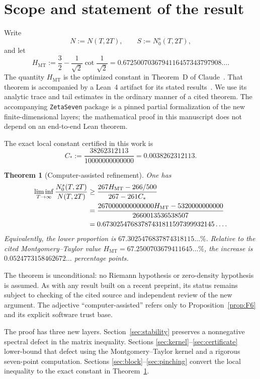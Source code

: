 \documentclass[11pt]{article}
\newtheorem{theorem}{Theorem}[section]
\newcommand{\MT}{\mathrm{MT}}
\newcommand{\Nsimple}{N_0^s}
\begin{document}
\section{Scope and statement of the result}

Write
\[
 N:=N(T,2T),\qquad S:=\Nsimple(T,2T),
\]
and let
\begin{equation}\label{eq:HMT}
 H_{\MT}:=\frac32-\frac1{\sqrt2}\cot\frac1{\sqrt2}
 =0.6725007036794116457343797908\ldots .
\end{equation}
The quantity $H_{\MT}$ is the optimized constant in Theorem~D of
Claude~\cite{Claude26}.  That theorem is accompanied by a Lean~4 artifact for
its stated results~\cite{ClaudeLean26}.  We use its analytic trace and tail
estimates in the ordinary manner of a cited theorem.  The accompanying
\texttt{ZetaSeven} package is a pinned partial formalization of the new
finite-dimensional layers; the mathematical proof in this manuscript does
not depend on an end-to-end Lean theorem.

The exact local constant certified in this work is
\begin{equation}\label{eq:Cstar}
 C_*:=\frac{38262312113}{10000000000000}
 =0.0038262312113.
\end{equation}

\begin{theorem}[Computer-assisted refinement]\label{thm:main}
One has
\begin{align}
 \liminf_{T\to\infty}\frac{\Nsimple(T,2T)}{N(T,2T)}
 &\ge \frac{267H_{\MT}-266/500}{267-261C_*}\label{eq:main-formula}\\
 &=\frac{2670000000000000H_{\MT}-5320000000000}
 {2660013536538507}\notag\\
 &=0.67302547683787431811597399932145\ldots .\notag
\end{align}
Equivalently, the lower proportion is
$67.3025476837874318115\ldots\%$.  Relative to the cited
Montgomery--Taylor value $H_{\MT}=67.2500703679411645\ldots\%$, the increase
is $0.0524773158462672\ldots$ percentage points.
\end{theorem}

The theorem is unconditional: no Riemann hypothesis or zero-density
hypothesis is assumed.  As with any result built on a recent preprint, its
status remains subject to checking of the cited source and independent
review of the new argument.  The adjective ``computer-assisted'' refers only
to Proposition~\ref{prop:F6} and its explicit software trust base.

The proof has three new layers.  Section~\ref{sec:stability} preserves a
nonnegative spectral defect in the matrix inequality.  Sections
\ref{sec:kernel}--\ref{sec:certificate} lower-bound that defect using the
Montgomery--Taylor kernel and a rigorous seven-point computation.  Sections
\ref{sec:block}--\ref{sec:pinching} convert the local inequality to the exact
constant in Theorem~\ref{thm:main}.
\end{document}
